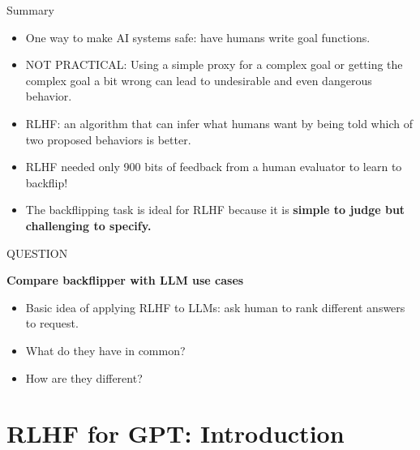 \begin{vbframe}{Summary}

\vfill

\textbf{}

	\begin{itemize}
		\item One way to make  AI
		systems safe: have humans 
		write goal functions.
		\item NOT PRACTICAL: Using a simple
		proxy for a complex goal or getting the
		complex goal a bit wrong can lead to
		undesirable and even dangerous behavior.
                \item
		RLHF: an algorithm that can infer
		what humans want by being told which of two
		proposed behaviors is better.
\item RLHF needed only 900 bits of feedback from a human
		evaluator to learn to backflip!
                \item The backflipping task is ideal
                for RLHF
       because it         is \textbf{simple to judge but challenging
	to specify.}
	\end{itemize}

\vfill

\end{vbframe}

\begin{vbframe}{QUESTION}

\vfill

\textbf{Compare backflipper with LLM use cases}

	\begin{itemize}
        \item Basic idea of applying RLHF to LLMs: ask human
        to rank different answers to request.
		\item What do they have in common?
                \item How are they different?

	\end{itemize}

\vfill

\end{vbframe}






\section{RLHF for GPT: Introduction}

